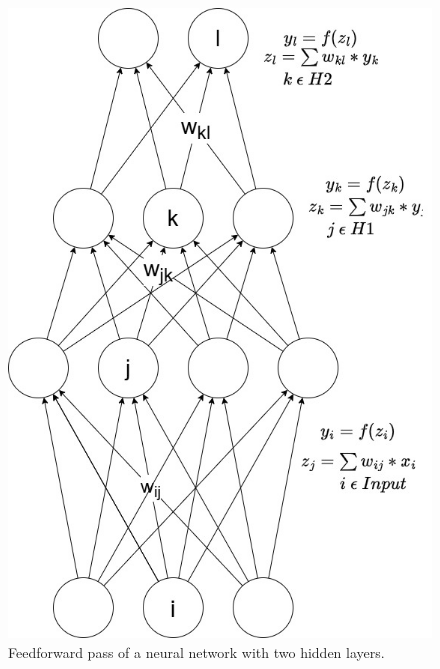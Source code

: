 \begin{figure}[ht]
    \centering 
    \includegraphics[width=0.6\linewidth]{figures/neural_net.jpg}
    \caption{Feedforward pass of a neural network with two hidden layers.} %
    \label{fig:forward_pass}
\end{figure}

